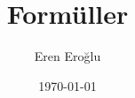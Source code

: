 \documentclass[a4paper, 10pt]{report}
\author{Eren Eroğlu}
\date{\today}
\title{Formüller}
\begin{document}
    \newtheorem*{theorem}{Teori}
    \theoremstyle{definition}
    \newtheorem*{definition}{Tanım}
    \maketitle
    \tableofcontents
    
    
    
    
    
\end{document}
